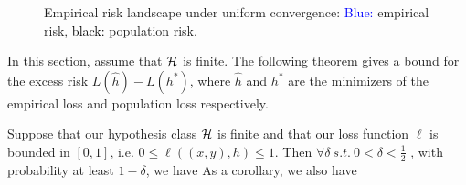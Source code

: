 \begin{figure}[t]
    \centering
    \caption{Empirical risk landscape under uniform convergence: \textcolor{blue}{Blue:} empirical risk, \textcolor{black}{black:} population risk.
    }
    \label{lec2:fig:shape}
\end{figure}


In this section, assume that $\mathcal H$ is finite. The following theorem gives a bound for the excess risk $L(\hat{h}) - L(h^{*})$, where $\hat{h}$ and $h^*$ are the minimizers of the empirical loss and population loss respectively.

\begin{theorem}\label{lec4:thm:finite}
Suppose that our hypothesis class $\mathcal H$ is finite and that our loss function $\ell$ is bounded in $[0,1]$, i.e. $0 \leq \ell((x, y), h) \leq 1$. Then $\forall \delta \  s.t. \  0 < \delta < \frac{1}{2}$ , with probability at least $1 - \delta$, we have 
As a corollary, we also have 
\end{theorem}

